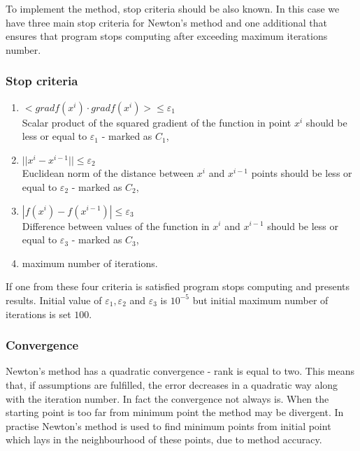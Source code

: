 \documentclass[12pt]{article}
\begin{document}
 To implement the method, stop criteria should be also known. In this case we have three main stop criteria for Newton's method and one additional that ensures that program stops computing after exceeding maximum iterations number.

\subsubsection{Stop criteria}
\begin{enumerate}
\item $ <grad f(x^i) \cdot grad f(x^i)> \leqslant \varepsilon_1 $ \\
Scalar product of the squared gradient of the function in point $x^i$ should be less or equal to $\varepsilon_1 $ - marked as $C_1$,
\item $ ||x^i-x^{i-1}|| \leqslant \varepsilon_2 $ \\
Euclidean norm of the distance between $x^i$ and $x^{i-1}$ points should be less or equal to $\varepsilon_2 $ - marked as $C_2$,
\item $ |f(x^i)-f(x^{i-1})| \leqslant \varepsilon_3 $ \\
Difference between values of the function in $x^i$ and $x^{i-1}$ should be less or equal to $\varepsilon_3 $ - marked as $C_3$,
\item maximum number of iterations.
\end{enumerate}  
If one from these four criteria is satisfied program stops computing and presents results. Initial value of $\varepsilon_1 , \varepsilon_2$ and $\varepsilon_3 $ is $10^{-5}$ but initial maximum number of iterations is set $100$.

\subsubsection{Convergence}
Newton's method has a quadratic convergence - rank is equal to two. This means that, if assumptions are fulfilled, the error decreases in a quadratic way along with the iteration number. In fact the convergence not always is. When the starting point is too far from minimum point the method may be divergent. In practise Newton's method is used to find minimum points from initial point which lays in the neighbourhood of these points, due to method accuracy. 
\end{document}
